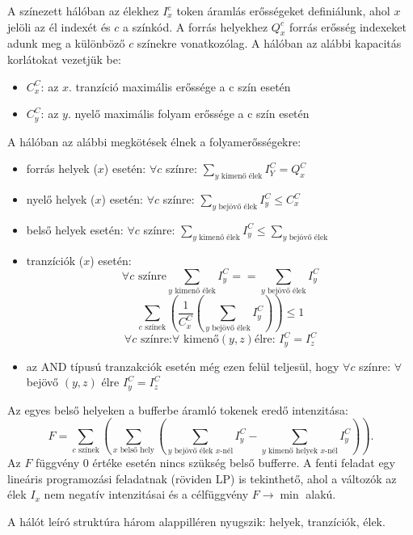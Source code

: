 A színezett hálóban az élekhez $I^c_x$ token áramlás erősségeket definiálunk, ahol $x$ jelöli az él indexét és $c$ a színkód. A forrás helyekhez $Q^c_x$ forrás erősség indexeket adunk meg a különböző $c$ színekre vonatkozólag. A hálóban az alábbi kapacitás korlátokat vezetjük be:
\begin{itemize}
\item $C^C_x$: az $x$. tranzíció maximális erőssége a c szín esetén 
\item $C^C_y$: az $y$. nyelő maximális folyam erőssége a c szín esetén
\end{itemize}
A hálóban az alábbi megkötések élnek a folyamerősségekre:
\begin{itemize}
\item forrás helyek ($x$) esetén: $\forall c$ színre: $\sum_{y\text{ kimenő élek}}I^C_Y = Q^C_x$
\item nyelő helyek ($x$) esetén: $\forall c$ színre: $\sum_{y\text{ bejövő élek}}I^C_y \leq C^C_x$
\item belső helyek esetén: $\forall c$ színre: $\sum_{y\text{ kimenő élek}} I^C_y \leq \sum_{y\text{ bejövő élek}}$
\item tranzíciók ($x$) esetén:
$$\forall c \text{ színre} \sum_{y\text{ kimenő élek}} I^C_y == \sum_{y\text{ bejövő élek}} I^C_y $$
$$\sum_{c \text{ színek}}\left( \frac{1}{C^C_x} \left( \sum_{y \text{ bejövő élek}} I^C_y \right) \right) \leq 1$$
$$\forall c \text{ színre:} \forall \text{ kimenő} (y,z) \text{élre: } I^C_y=I^C_z$$
\item az AND típusú tranzakciók esetén még ezen felül teljesül, hogy 	$\forall c$ színre: $\forall$ bejövő $(y,z)$ élre $I^C_y=I^C_z$
\end{itemize}
Az egyes belső helyeken a bufferbe áramló tokenek  eredő intenzitása:
$$F=\sum_{c\text{ színek}} \left( \sum_{x\text{ belső hely}}\left( \sum_{y\text{ bejövő élek }x\text{-nél}}I^C_y - \sum_{y \text{ kimenő helyek }x\text{-nél}} I^C_y \right) \right).$$
Az $F$ függvény 0 értéke esetén nincs szükség belső bufferre. 
A fenti feladat egy lineáris programozási feladatnak (röviden LP) is tekinthető, ahol a változók az élek $I_x$ nem negatív intenzitásai és a célfüggvény $F \rightarrow \min$ alakú. 
\newpage
{}

A hálót leíró struktúra három alappilléren nyugszik: helyek, tranzíciók, élek.

